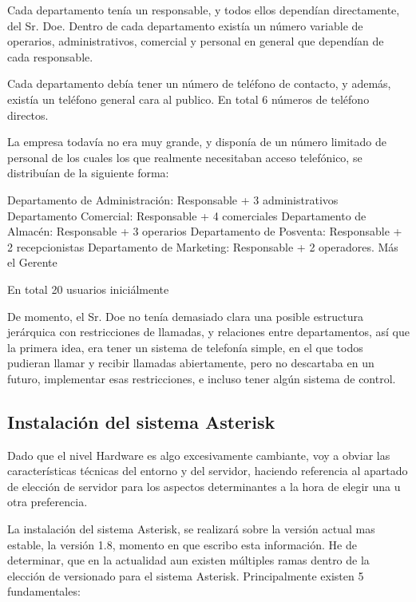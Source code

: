 Cada departamento tenía un responsable, y todos ellos dependían directamente, del Sr. Doe. Dentro de cada departamento existía un número variable de operarios, administrativos, comercial y personal en general que dependían de cada responsable.

Cada departamento debía tener un número de teléfono de contacto, y además, existía un teléfono general cara al publico. En total 6 números de teléfono directos.

La empresa todavía no era muy grande, y disponía de un número limitado de personal de los cuales los que realmente necesitaban acceso telefónico, se distribuían de la siguiente forma:

Departamento de Administración: Responsable + 3 administrativos
Departamento Comercial: Responsable + 4 comerciales
Departamento de Almacén: Responsable + 3 operarios
Departamento de Posventa: Responsable + 2 recepcionistas
Departamento de Marketing: Responsable + 2 operadores.
Más el Gerente

En total 20 usuarios iniciálmente

De momento, el Sr. Doe no tenía demasiado clara una posible estructura jerárquica con restricciones de llamadas, y relaciones entre departamentos, así que la primera idea, era tener un sistema de telefonía simple, en el que todos pudieran llamar y recibir llamadas abiertamente, pero no descartaba en un futuro, implementar esas restricciones, e incluso tener algún sistema de control.

\newpage

\color[rgb]{0,0,0}

\subsection{Instalación del sistema Asterisk}

Dado que el nivel Hardware es algo excesivamente cambiante, voy a obviar las características técnicas del entorno y del servidor, haciendo referencia al apartado de elección de servidor para los aspectos determinantes a la hora de elegir una u otra preferencia.

La instalación del sistema Asterisk, se realizará sobre la versión actual mas estable, la versión 1.8, momento en que escribo esta información. He de determinar, que en la actualidad aun existen múltiples ramas dentro de la elección de versionado para el sistema Asterisk. Principalmente existen 5 fundamentales:


